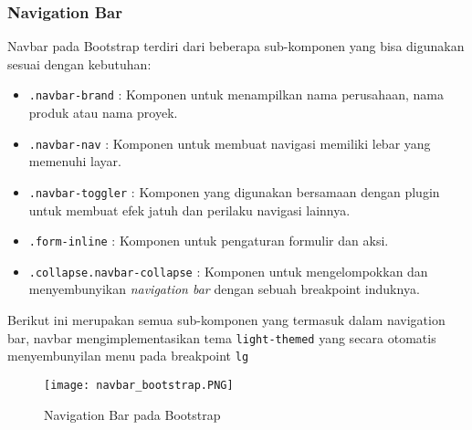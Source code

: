 \subsubsection{Navigation Bar}
Navbar pada Bootstrap terdiri dari beberapa sub-komponen yang bisa digunakan sesuai dengan kebutuhan:
\begin{itemize}
    \item \texttt{.navbar-brand} : Komponen untuk menampilkan nama perusahaan, nama produk atau nama proyek.
    \item \texttt{.navbar-nav} : Komponen untuk membuat navigasi memiliki lebar yang memenuhi layar.
    \item \texttt{.navbar-toggler} : Komponen yang digunakan bersamaan dengan plugin untuk membuat efek jatuh dan perilaku navigasi lainnya.
    \item \texttt{.form-inline} : Komponen untuk pengaturan formulir dan aksi.
    \item \texttt{.collapse.navbar-collapse} : Komponen untuk mengelompokkan dan menyembunyikan \textit{navigation bar} dengan sebuah breakpoint induknya.
\end{itemize}
Berikut ini merupakan semua sub-komponen yang termasuk dalam navigation bar, navbar mengimplementasikan tema \texttt{light-themed} yang secara otomatis menyembunyilan menu pada breakpoint \texttt{lg}
\begin{figure} [H]
	\centering  
	\texttt{[image: navbar\_bootstrap.PNG]}  
	\caption{Navigation Bar pada Bootstrap} 
\end{figure}

